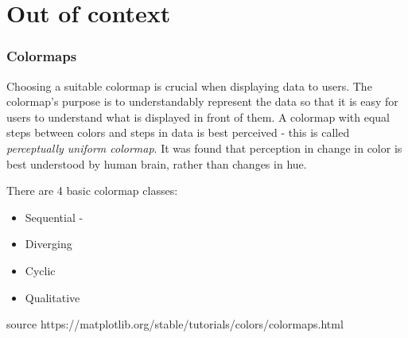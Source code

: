 \chapter{Out of context}

\subsection{Colormaps}

Choosing a suitable colormap is crucial when displaying data to users. The colormap's purpose is to understandably represent the data so that it is easy for users to understand what is displayed in front of them. A colormap with equal steps between colors and steps in data is best perceived - this is called \textit{perceptually uniform colormap}. It was found that perception in change in color is best understood by human brain, rather than changes in hue. 

There are 4 basic colormap classes:

\begin{itemize}
    \item Sequential - 
    \item Diverging
    \item Cyclic
    \item Qualitative
\end{itemize}
source https://matplotlib.org/stable/tutorials/colors/colormaps.html